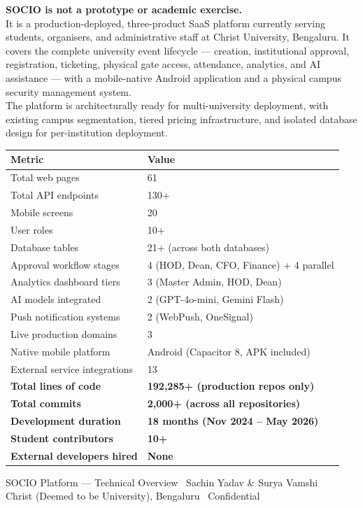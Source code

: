 \documentclass[12pt,a4paper]{article}
\begin{document}
\begin{highlightbox}
\textbf{SOCIO is not a prototype or academic exercise.}\\[0.4cm]
It is a production-deployed, three-product SaaS platform currently serving students, organisers, and administrative staff at Christ University, Bengaluru. It covers the complete university event lifecycle — creation, institutional approval, registration, ticketing, physical gate access, attendance, analytics, and AI assistance — with a mobile-native Android application and a physical campus security management system.\\[0.4cm]
The platform is architecturally ready for multi-university deployment, with existing campus segmentation, tiered pricing infrastructure, and isolated database design for per-institution deployment.
\end{highlightbox}

\vspace{1cm}

\begin{tabularx}{\textwidth}{L{5cm} X}
\toprule
{}
\textbf{Metric} & \textbf{Value} \\
\midrule
Total web pages & 61 \\
Total API endpoints & 130+ \\
Mobile screens & 20 \\
User roles & 10+ \\
Database tables & 21+ (across both databases) \\
Approval workflow stages & 4 (HOD, Dean, CFO, Finance) + 4 parallel \\
Analytics dashboard tiers & 3 (Master Admin, HOD, Dean) \\
AI models integrated & 2 (GPT-4o-mini, Gemini Flash) \\
Push notification systems & 2 (WebPush, OneSignal) \\
Live production domains & 3 \\
Native mobile platform & Android (Capacitor 8, APK included) \\
External service integrations & 13 \\
\midrule
{}
\textbf{Total lines of code} & \textbf{192,285+ (production repos only)} \\
\textbf{Total commits} & \textbf{2,000+ (across all repositories)} \\
\textbf{Development duration} & \textbf{18 months (Nov 2024 -- May 2026)} \\
\textbf{Student contributors} & \textbf{10+} \\
\textbf{External developers hired} & \textbf{None} \\
\bottomrule
\end{tabularx}

\vspace{2cm}
\begin{center}
{\small\color{darkgray}
SOCIO Platform — Technical Overview \textbullet\ Sachin Yadav \& Surya Vamshi\\
Christ (Deemed to be University), Bengaluru \textbullet\ Confidential
}
\end{center}
\end{document}
